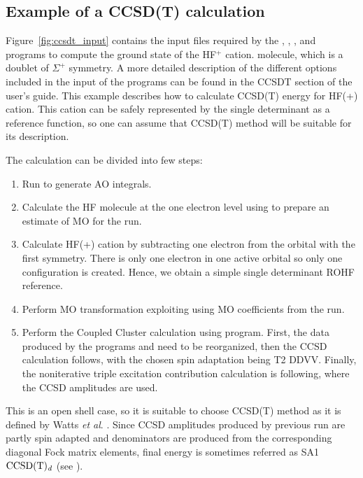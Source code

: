 \subsection{Example of a CCSD(T) calculation}

Figure~\ref{fig:ccsdt_input} contains the input files required by the
, , 
,  and 
programs to compute the ground state of the HF$^+$ cation.
molecule, which is a doublet of $\Sigma^+$ symmetry. A more detailed 
description of the different options included in the input of the
programs can be found in the CCSDT section of the user's guide.
This example describes how to calculate CCSD(T) energy for HF(+) cation.
This cation can be safely represented by the single determinant as a reference
function, so one can assume that CCSD(T) method will be suitable for its
description.

The calculation can be divided into few steps:
\begin{enumerate}
\item
Run  to generate AO integrals.
\item
Calculate the HF molecule at the one electron level using  to
prepare an estimate of MO for the  run.
\item
Calculate HF(+) cation by subtracting one electron from the orbital with
the first symmetry. There is  only one electron in one active orbital
so only one configuration is created. Hence, we obtain a simple single
determinant ROHF reference.
\item
Perform MO transformation exploiting  using MO coefficients
from the  run.
\item
Perform the Coupled Cluster calculation using  program. First,
the data produced by the programs  and  need
to be reorganized, then the CCSD calculation follows, with the chosen spin
adaptation being T2 DDVV. Finally, the noniterative triple excitation contribution
calculation is following, where the CCSD amplitudes are used.
\end{enumerate}

This is an open shell case, so it is suitable to choose CCSD(T) method
as it is defined by Watts {\em et al}. \cite{t3_watts}.
Since CCSD amplitudes produced by previous  run are partly
spin adapted and denominators are produced from the corresponding diagonal
 Fock matrix elements,
final energy is sometimes referred as SA1 ${\rm CCSD(T)_{\it d}}$ (see
\cite{t3_neo}).

